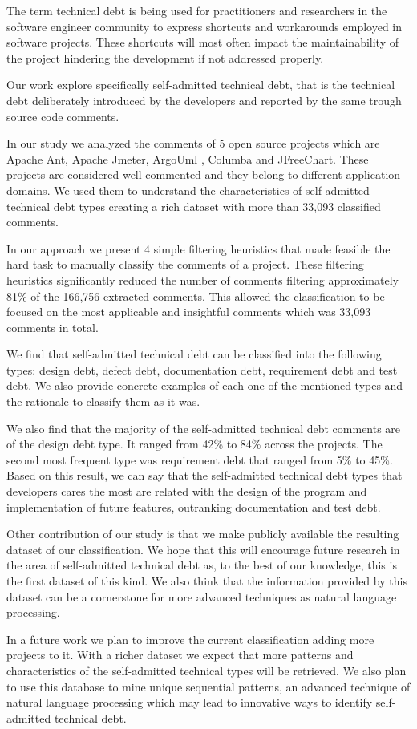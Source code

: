 The term technical debt is being used for practitioners and researchers in the software engineer community to express shortcuts and workarounds employed in software projects. These shortcuts will most often impact the maintainability of the project hindering the development if not addressed properly.

Our work explore specifically self-admitted technical debt, that is the technical debt deliberately introduced by the developers and reported by the same trough source code comments.

In our study we analyzed the comments of 5 open source projects which are Apache Ant, Apache Jmeter, ArgoUml , Columba and JFreeChart. These projects are considered well commented and they belong to different application domains. We used them to understand the characteristics of self-admitted technical debt types creating a rich dataset with more than 33,093 classified comments.

In our approach we present 4 simple filtering heuristics that made feasible the hard task to manually classify the comments of a project. These filtering heuristics significantly reduced the number of comments filtering approximately 81\% of the 166,756 extracted comments. This allowed the classification to be focused on the most applicable and insightful comments which was 33,093 comments in total. 

We find that self-admitted technical debt can be classified into the following types: design debt, defect debt, documentation debt, requirement debt and test debt. We also provide concrete examples of each one of the mentioned types and the rationale to classify them as it was.  

We also find that the majority of the self-admitted technical debt comments are of the design debt type. It ranged from 42\% to 84\% across the projects. The second most frequent type was requirement debt that ranged from 5\% to 45\%. Based on this result, we can say that the self-admitted technical debt types that developers cares the most are related with the design of the program and implementation of future features, outranking documentation and test debt.

Other contribution of our study is that we make publicly available the resulting dataset of our classification. We hope that this will encourage future research in the area of self-admitted technical debt as, to the best of our knowledge, this is the first dataset of this kind. We also think that the information provided by this dataset can be a cornerstone for more advanced techniques as natural language processing.   

In a future work we plan to improve the current classification adding more projects to it. With a richer dataset we expect that more patterns and characteristics of the self-admitted technical types will be retrieved. We also plan to use this database to mine unique sequential patterns, an advanced technique of natural language processing which may lead to innovative ways to identify self-admitted technical debt. 
